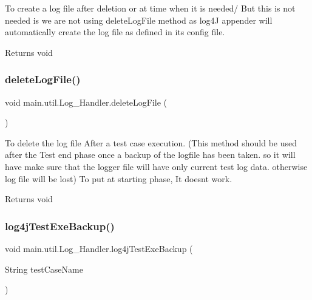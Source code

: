 To create a log file after deletion or at time when it is needed/ But this is not needed is we are not using delete\+Log\+File method as log4J appender will automatically create the log file as defined in its config file. \begin{DoxyReturn}{Returns}
void 
\end{DoxyReturn}
\mbox{\label{classmain_1_1util_1_1_log___handler_a5b492631563d77695ca14d0dd3af05ec}} 
\subsubsection{\texorpdfstring{delete\+Log\+File()}{deleteLogFile()}}
{\footnotesize\ttfamily void main.\+util.\+Log\+\_\+\+Handler.\+delete\+Log\+File (\begin{DoxyParamCaption}{ }\end{DoxyParamCaption})}

To delete the log file After a test case execution. (This method should be used after the Test end phase once a backup of the logfile has been taken. so it will have make sure that the logger file will have only current test log data. otherwise log file will be lost) To put at starting phase, It doesn\textquotesingle{}t work. \begin{DoxyReturn}{Returns}
void 
\end{DoxyReturn}
\mbox{\label{classmain_1_1util_1_1_log___handler_a08694f23b4736996c217c3ae80768fa1}} 
\subsubsection{\texorpdfstring{log4j\+Test\+Exe\+Backup()}{log4jTestExeBackup()}}
{\footnotesize\ttfamily void main.\+util.\+Log\+\_\+\+Handler.\+log4j\+Test\+Exe\+Backup (\begin{DoxyParamCaption}\item[{String}]{test\+Case\+Name }\end{DoxyParamCaption})}

